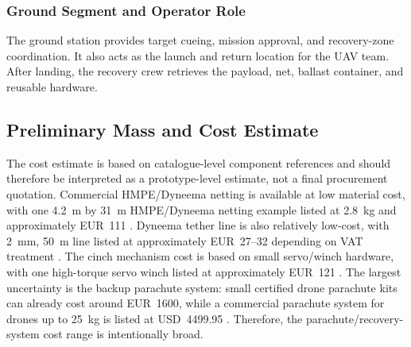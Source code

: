 \subsubsection{Ground Segment and Operator Role}

The ground station provides target cueing, mission approval, and recovery-zone coordination. It also acts as the launch and return location for the UAV team. After landing, the recovery crew retrieves the payload, net, ballast container, and reusable hardware.





\subsection{Preliminary Mass and Cost Estimate}






The cost estimate is based on catalogue-level component references and should therefore be interpreted as a prototype-level estimate, not a final procurement quotation. Commercial HMPE/Dyneema netting is available at low material cost, with one 4.2~m by 31~m HMPE/Dyneema netting example listed at 2.8~kg and approximately EUR~111 \cite{Netmark2026HMPE/DyneemaHM}. Dyneema tether line is also relatively low-cost, with 2~mm, 50~m line listed at approximately EUR~27--32 depending on VAT treatment \cite{Spearfishing.de2026DyneemaM}. The cinch mechanism cost is based on small servo/winch hardware, with one high-torque servo winch listed at approximately EUR~121 \cite{FlashRC2026ServoTurns}. The largest uncertainty is the backup parachute system: small certified drone parachute kits can already cost around EUR~1600, while a commercial parachute system for drones up to 25~kg is listed at USD~4499.95 \cite{MegaDron2026MOCSeries,UAVSystemsInternational2026DroneKg}. Therefore, the parachute/recovery-system cost range is intentionally broad.
\setlength{\tabcolsep}{3pt}
\renewcommand{\arraystretch}{1.25}

